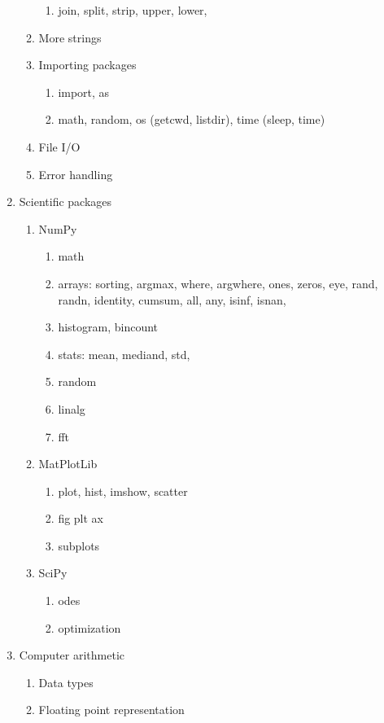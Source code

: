 \documentclass{article}
\begin{document}
\begin{multicols}{2}
\begin{enumerate}
\begin{enumerate}
\begin{enumerate}
		\end{enumerate}
		\begin{enumerate}
			\item join, split, strip, upper, lower, 
		\end{enumerate}
		\item More strings
		\item Importing packages
			\begin{enumerate}
			\item import, as
			\item math, random, os (getcwd, listdir), time (sleep, time)
		\end{enumerate}
		\item File I/O
		\item Error handling
	\end{enumerate}
	\item Scientific packages
	\begin{enumerate}
		\item NumPy
		\begin{enumerate}
			\item math
			\item arrays: sorting, argmax, where, argwhere, ones, zeros, eye, rand, randn, identity, cumsum, all, any, isinf, isnan, 
			\item histogram, bincount
			\item stats: mean, mediand, std, 
			\item random
			\item linalg
			\item fft
		\end{enumerate}
		\item MatPlotLib
		\begin{enumerate}
			\item plot, hist, imshow, scatter
			\item fig plt ax
			\item subplots
		\end{enumerate}
		\item SciPy
		\begin{enumerate}
			\item odes
			\item optimization
		\end{enumerate}
	\end{enumerate}
	\item Computer arithmetic
	\begin{enumerate}
		\item Data types
		\item Floating point representation

\end{enumerate}
\end{enumerate}
\end{multicols}
\end{document}
